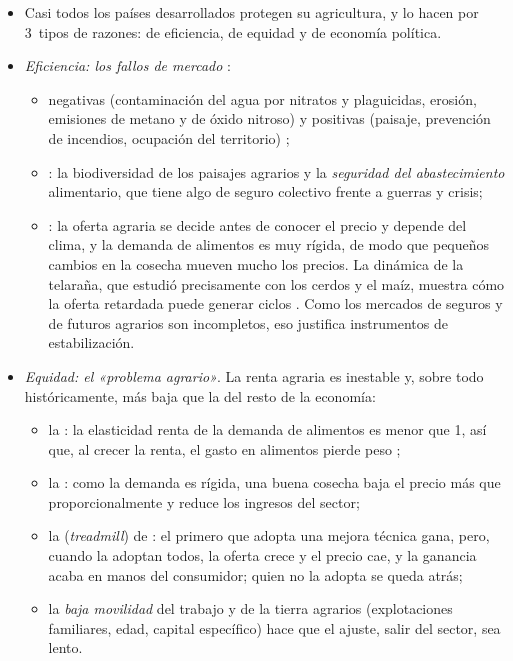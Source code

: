 \documentclass[11pt]{article}
\begin{document}
\begin{itemize}
\item Casi todos los países desarrollados protegen su agricultura, y lo hacen por 3~tipos de razones: de eficiencia, de equidad y de economía política\nocite{CamareroTamaritAnchuelo2019,CuencaNavarro2015}.
\item \emph{Eficiencia: los fallos de mercado} :
  \begin{itemize}
  \item {} negativas (contaminación del agua por nitratos y plaguicidas, erosión, emisiones de metano y de óxido nitroso) y positivas (paisaje, prevención de incendios, ocupación del territorio) ;
  \item {}: la biodiversidad de los paisajes agrarios y la \emph{seguridad del abastecimiento} alimentario, que tiene algo de seguro colectivo frente a guerras y crisis;
  \item {}: la oferta agraria se decide antes de conocer el precio y depende del clima, y la demanda de alimentos es muy rígida, de modo que pequeños cambios en la cosecha mueven mucho los precios. La dinámica de la telaraña, que  estudió precisamente con los cerdos y el maíz, muestra cómo la oferta retardada puede generar ciclos . Como los mercados de seguros y de futuros agrarios son incompletos, eso justifica instrumentos de estabilización.
  \end{itemize}
\item \emph{Equidad: el «problema agrario»}. La renta agraria es inestable y, sobre todo históricamente, más baja que la del resto de la economía:
  \begin{itemize}
  \item la : la elasticidad renta de la demanda de alimentos es menor que 1, así que, al crecer la renta, el gasto en alimentos pierde peso ;
  \item la : como la demanda es rígida, una buena cosecha baja el precio más que proporcionalmente y reduce los ingresos del sector;
  \item la  (\emph{treadmill}) de \textcite{Cochrane1958Farm}: el primero que adopta una mejora técnica gana, pero, cuando la adoptan todos, la oferta crece y el precio cae, y la ganancia acaba en manos del consumidor; quien no la adopta se queda atrás;
  \item la \emph{baja movilidad} del trabajo y de la tierra agrarios (explotaciones familiares, edad, capital específico) hace que el ajuste, salir del sector, sea lento.

\end{itemize}
\end{itemize}
\end{document}
